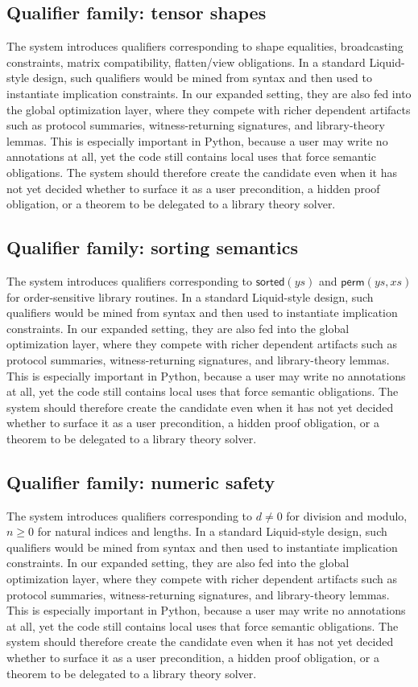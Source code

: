 \documentclass[11pt]{article}
\theoremstyle{definition}
\theoremstyle{plain}
\begin{document}
\subsection{Qualifier family: tensor shapes}
The system introduces qualifiers corresponding to shape equalities, broadcasting constraints, matrix compatibility, flatten/view obligations. In a standard
Liquid-style design, such qualifiers would be mined from syntax and then used
to instantiate implication constraints. In our expanded setting, they are also
fed into the global optimization layer, where they compete with richer
dependent artifacts such as protocol summaries, witness-returning signatures,
and library-theory lemmas. This is especially important in Python, because a
user may write no annotations at all, yet the code still contains local uses
that force semantic obligations. The system should therefore create the
candidate even when it has not yet decided whether to surface it as a user
precondition, a hidden proof obligation, or a theorem to be delegated to a
library theory solver.

\subsection{Qualifier family: sorting semantics}
The system introduces qualifiers corresponding to \(\mathsf{sorted}(ys)\) and \(\mathsf{perm}(ys,xs)\) for order-sensitive library routines. In a standard
Liquid-style design, such qualifiers would be mined from syntax and then used
to instantiate implication constraints. In our expanded setting, they are also
fed into the global optimization layer, where they compete with richer
dependent artifacts such as protocol summaries, witness-returning signatures,
and library-theory lemmas. This is especially important in Python, because a
user may write no annotations at all, yet the code still contains local uses
that force semantic obligations. The system should therefore create the
candidate even when it has not yet decided whether to surface it as a user
precondition, a hidden proof obligation, or a theorem to be delegated to a
library theory solver.

\subsection{Qualifier family: numeric safety}
The system introduces qualifiers corresponding to \(d \neq 0\) for division and modulo, \(n \ge 0\) for natural indices and lengths. In a standard
Liquid-style design, such qualifiers would be mined from syntax and then used
to instantiate implication constraints. In our expanded setting, they are also
fed into the global optimization layer, where they compete with richer
dependent artifacts such as protocol summaries, witness-returning signatures,
and library-theory lemmas. This is especially important in Python, because a
user may write no annotations at all, yet the code still contains local uses
that force semantic obligations. The system should therefore create the
candidate even when it has not yet decided whether to surface it as a user
precondition, a hidden proof obligation, or a theorem to be delegated to a
library theory solver.
\end{document}
